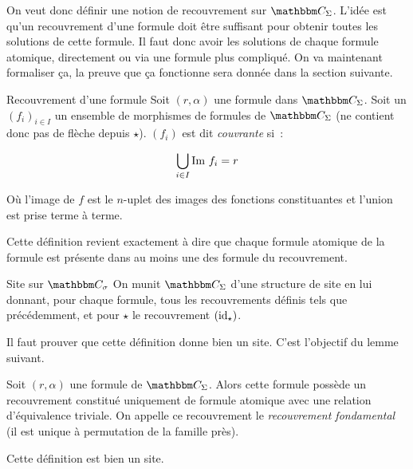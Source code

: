 On veut donc définir une notion de recouvrement sur $\C_\Sigma$. L'idée est
qu'un recouvrement d'une formule doit être suffisant pour obtenir toutes les
solutions de cette formule. Il faut donc avoir les solutions de chaque formule
atomique, directement ou via une formule plus compliqué. On va maintenant
formaliser ça, la preuve que ça fonctionne sera donnée dans la section
suivante.

\begin{defi}{Recouvrement d'une formule}
    Soit $(r,\alpha)$ une formule dans $\C_\Sigma$. Soit un $(f_i)_{i\in I}$ un ensemble
    de morphismes de formules de $\C_\Sigma$ (ne contient donc pas de flèche depuis
    $\star$). $(f_i)$ est dit \emph{couvrante} si~:

    \[ \bigcup_{i\in I} \text{Im } f_i = r \]

    Où l'image de $f$ est le $n$-uplet des images des fonctions constituantes et
    l'union est prise terme à terme.
\end{defi}

Cette définition revient exactement à dire que chaque formule atomique de la formule est
présente dans au moins une des formule du recouvrement.

\begin{defi}{Site sur $\C_\sigma$}
    On munit $\C_\Sigma$ d'une structure de site en lui donnant, pour chaque formule,
    tous les recouvrements définis tels que précédemment, et pour $\star$ le recouvrement
    $(\operatorname{id}_\star)$.
\end{defi}

Il faut prouver que cette définition donne bien un site. C'est l'objectif du
lemme suivant.

\begin{rem}
    Soit $(r,\alpha)$ une formule de $\C_\Sigma$. Alors cette formule possède un
    recouvrement constitué uniquement de formule atomique avec une relation d'équivalence
    triviale. On appelle ce recouvrement le \emph{recouvrement fondamental}
    (il est unique à permutation de la famille près).
\end{rem}

\begin{lem}
    Cette définition est bien un site.
\end{lem}

